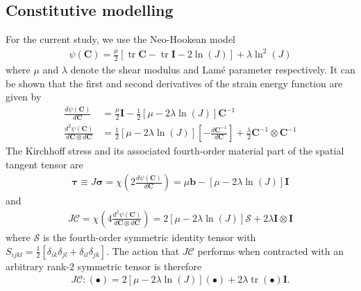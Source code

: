 \documentclass[times,doublespace]{nmeauth}
\DeclareMathOperator{\trace}{tr}
\begin{document}
\subsection{Constitutive modelling}

For the current study, we use the Neo-Hookean model
\begin{gather}
\psi \left( \mathbf{C} \right)
  = \frac{\mu}{2} \left[ \trace{\mathbf{C}} - \trace{\mathbf{I}} - 2 \ln\left( J \right) \right]
  + \lambda \ln^{2}\left( J \right)
\end{gather}
where $\mu$ and $\lambda$ denote the shear modulus and Lam\'{e} parameter respectively. It can be shown that the first and second derivatives of the strain energy function are given by
\begin{align}
\frac{d \psi \left( \mathbf{C} \right)}{d \mathbf{C}}
  &= \frac{\mu}{2} \mathbf{I} - \frac{1}{2} \left[ \mu - 2\lambda\ln\left( J \right) \right] \mathbf{C}^{-1} \\
\frac{d^{2} \psi \left( \mathbf{C} \right)}{d \mathbf{C} \otimes d \mathbf{C}}
  &= \frac{1}{2}\left[ \mu - 2\lambda\ln\left( J \right) \right] \left[ - \frac{d \mathbf{C}^{-1}}{d \mathbf{C}} \right]
  + \frac{\lambda}{2} \mathbf{C}^{-1} \otimes \mathbf{C}^{-1}
\end{align}
The Kirchhoff stress and its associated {\color{red}fourth-order material part of the spatial tangent tensor} are
\begin{gather}
\boldsymbol{\tau}
  \equiv J \boldsymbol{\sigma}
  = \chi\left( 2 \frac{d \psi \left( \mathbf{C} \right)}{d \mathbf{C}} \right)
  = \mu \mathbf{b} - \left[ \mu - 2\lambda\ln\left( J \right) \right] \mathbf{I}
\end{gather}
and
\begin{gather}
J \boldsymbol{\mathcal{C}}
  = \chi\left( 4 \frac{d^{2} \psi \left( \mathbf{C} \right)}{d \mathbf{C} \otimes d \mathbf{C}} \right)
  = 2 \left[ \mu - 2\lambda\ln\left( J \right) \right] \boldsymbol{\mathcal{S}}
  + 2 \lambda \mathbf{I} \otimes \mathbf{I}
\end{gather}
where $\boldsymbol{\mathcal{S}}$ is the fourth-order symmetric identity tensor
{\color{red}with $S_{ijkl}=\frac{1}{2}\left[\delta_{ik}\delta_{jl}+\delta_{il}\delta_{jk}\right]$}.
The action that $J \boldsymbol{\mathcal{C}}$ performs when contracted with an arbitrary rank-2 symmetric tensor is therefore
\begin{gather}
J \boldsymbol{\mathcal{C}} : \left( \bullet \right)
  = 2 \left[ \mu - 2\lambda\ln\left( J \right) \right] \left( \bullet \right)
  + 2 \lambda \trace\left( \bullet \right) \mathbf{I}.
\label{eq:simplified_action}
\end{gather}
\end{document}
